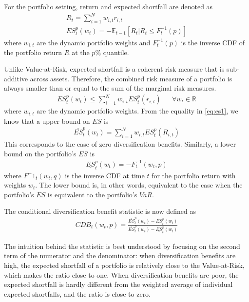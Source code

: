 For the portfolio setting, return and expected shortfall are denoted as
\begin{align}
    R_{t} = \sum\limits^N_{i=1} w_{i,t} r_{i,t} \\
    ES^p_t(w_t) = -\mathbb{E}_{t-1}[R_{t} | R_{t} \leq F_{t}^{-1}(p)]
\end{align}
where $w_{i,t}$ are the dynamic portfolio weights and $F_{t}^{-1}(p)$ is the inverse CDF of the portfolio return $R$ at the $p\%$ quantile.

Unlike Value-at-Risk, expected shortfall is a coherent risk measure that is sub-additive across assets. Therefore, the combined risk measure of a portfolio is always smaller than or equal to the sum of the marginal risk measures.
\begin{align} \label{eq:es1}
    ES^p_t(w_t) \leq \sum\limits^N_{i=1} w_{i,t} ES^p_t(r_{i,t}) && \forall w_t \in \mathbb{R}
\end{align}
where $w_{i,t}$ are the dynamic portfolio weights. From the equality in \autoref{eq:es1}, we know that a upper bound on $ES$ is
\begin{align}
    \overline{ES}^p_t(w_t) = \sum\limits^N_{i=1} w_{i,t} ES^p_t(R_{i,t})
\end{align}
This corresponds to the case of zero diversification benefits. Similarly, a lower bound on the portfolio's $ES$ is
\begin{align}
    \underline{ES}^p_t(w_t) = -F^{-1}_t(w_t, p) 
\end{align}
where $F^-1_t(w_t, q)$ is the inverse CDF at time $t$ for the portfolio return with weights $w_t$. The lower bound is, in other words, equivalent to the case when the portfolio's $ES$ is equivalent to the portfolio's $VaR$.

The conditional diversification benefit statistic is now defined as
\begin{align}
    CDB_t(w_t,p) = \frac{\overline{ES}^p_t(w_t) - ES^p_t(w_t)}{\overline{ES}^p_t(w_t) - \underline{ES}^p_t(w_t)}
\end{align}

The intuition behind the statistic is best understood by focusing on the second term of the numerator and the denominator: when diversification benefits are high, the expected shortfall of a portfolio is relatively close to the Value-at-Risk, which makes the ratio close to one. When diversification benefits are poor, the expected shortfall is hardly different from the weighted average of individual expected shortfalls, and the ratio is close to zero.

